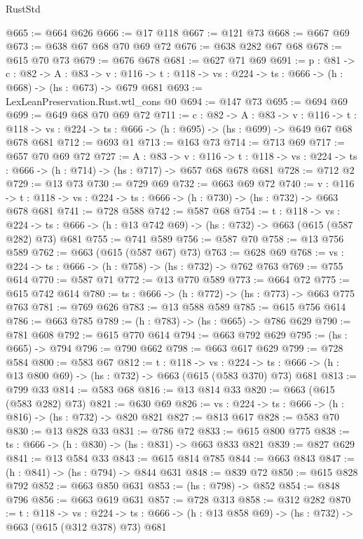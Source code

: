 \begin{lexlean}{RustStd}
\begin{coremodule}
@665 := @664 @626
@666 := @17 @118
@667 := @121 @73
@668 := @667 @69
@673 := @638 @67 @68 @70 @69 @72
@676 := @638 @282 @67 @68
@678 := @615 @70 @73
@679 := @676 @678
@681 := @627 @71 @69
@691 := {p : @81} ->
  {c : @82} ->
  {A : @83} ->
  {v : @116} -> {t : @118} -> {vs : @224} -> {ts : @666} -> (h : @668) -> (hs : @673) -> @679 @681
@693 := LexLeanPreservation.Rust.wtl_cons @0
@694 := @147 @73
@695 := @694 @69
@699 := @649 @68 @70 @69 @72
@711 := {c : @82} ->
  {A : @83} ->
  {v : @116} ->
  {t : @118} -> {vs : @224} -> {ts : @666} -> (h : @695) -> (hs : @699) -> @649 @67 @68 @678 @681
@712 := @693 @1
@713 := @163 @73
@714 := @713 @69
@717 := @657 @70 @69 @72
@727 := {A : @83} ->
  {v : @116} ->
  {t : @118} -> {vs : @224} -> {ts : @666} -> (h : @714) -> (hs : @717) -> @657 @68 @678 @681
@728 := @712 @2
@729 := @13 @73
@730 := @729 @69
@732 := @663 @69 @72
@740 := {v : @116} ->
  {t : @118} -> {vs : @224} -> {ts : @666} -> (h : @730) -> (hs : @732) -> @663 @678 @681
@741 := @728 @588
@742 := @587 @68
@754 := {t : @118} ->
  {vs : @224} ->
  {ts : @666} -> (h : @13 @742 @69) -> (hs : @732) -> @663 (@615 (@587 @282) @73) @681
@755 := @741 @589
@756 := @587 @70
@758 := @13 @756 @589
@762 := @663 (@615 (@587 @67) @73)
@763 := @628 @69
@768 := {vs : @224} -> {ts : @666} -> (h : @758) -> (hs : @732) -> @762 @763
@769 := @755 @614
@770 := @587 @71
@772 := @13 @770 @589
@773 := @664 @72
@775 := @615 @742 @614
@780 := {ts : @666} -> (h : @772) -> (hs : @773) -> @663 @775 @763
@781 := @769 @626
@783 := @13 @588 @589
@785 := @615 @756 @614
@786 := @663 @785
@789 := (h : @783) -> (hs : @665) -> @786 @629
@790 := @781 @608
@792 := @615 @770 @614
@794 := @663 @792 @629
@795 := (hs : @665) -> @794
@796 := @790 @662
@798 := @663 @617 @629
@799 := @728 @584
@800 := @583 @67
@812 := {t : @118} ->
  {vs : @224} ->
  {ts : @666} -> (h : @13 @800 @69) -> (hs : @732) -> @663 (@615 (@583 @370) @73) @681
@813 := @799 @33
@814 := @583 @68
@816 := @13 @814 @33
@820 := @663 (@615 (@583 @282) @73)
@821 := @630 @69
@826 := {vs : @224} -> {ts : @666} -> (h : @816) -> (hs : @732) -> @820 @821
@827 := @813 @617
@828 := @583 @70
@830 := @13 @828 @33
@831 := @786 @72
@833 := @615 @800 @775
@838 := {ts : @666} -> (h : @830) -> (hs : @831) -> @663 @833 @821
@839 := @827 @629
@841 := @13 @584 @33
@843 := @615 @814 @785
@844 := @663 @843
@847 := (h : @841) -> (hs : @794) -> @844 @631
@848 := @839 @72
@850 := @615 @828 @792
@852 := @663 @850 @631
@853 := (hs : @798) -> @852
@854 := @848 @796
@856 := @663 @619 @631
@857 := @728 @313
@858 := @312 @282
@870 := {t : @118} ->
  {vs : @224} ->
  {ts : @666} -> (h : @13 @858 @69) -> (hs : @732) -> @663 (@615 (@312 @378) @73) @681

\end{coremodule}
\end{lexlean}
